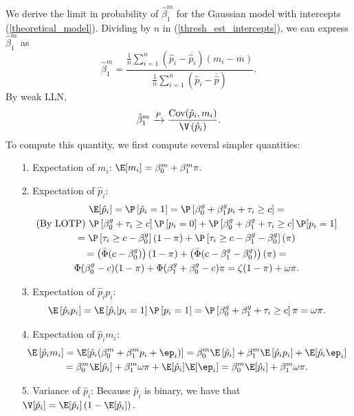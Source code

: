 \documentclass[12pt]{article}
\begin{document}
We derive the limit in probability of $\hat{\beta}^m_1$ for the Gaussian model with intercepts (\ref{theoretical_model}). Dividing by $n$ in (\ref{thresh_est_intercepts}), we can express $\hat{\beta}^m_1$ as
$$ \hat{\beta}^m_1 = \frac{ \frac{1}{n} \sum_{i=1}^n ( \hat{p}_i - \overline{\hat{p}_i})(m_i - \overline{m})}{ \frac{1}{n} \sum_{i=1}^n (\hat{p}_i - \overline{\hat{p}})}.$$ By weak LLN,
$$ \hat{\beta}^m_1 \xrightarrow{P} \frac{\textrm{Cov}(\hat{p}_i, m_i)}{\V\left(\hat{p}_i\right)}.$$ To compute this quantity, we first compute several simpler quantities:
\begin{itemize}
\item[1.] Expectation of $m_i$: $\E[m_i] = \beta^m_0 + \beta^m_1\pi.$
\item[2.] Expectation of $\hat{p}_i$: \begin{multline*}
\E[\hat{p}_i] = \P\left[\hat{p}_i = 1\right] = \P\left[\beta^g_0 + \beta^g_1 p_i + \tau_i \geq c \right] = \\ \textrm{(By LOTP) } \P\left[ \beta^g_0 + \tau_i \geq c \right]\P\left[p_i = 0\right] + \P\left[ \beta^g_0 + \beta^g_1 + \tau_i \geq c \right] \P[p_i = 1] \\ = \P\left[ \tau_i \geq c - \beta^g_0\right](1- \pi) + \P\left[ \tau_i \geq c - \beta^g_1 - \beta^g_0 \right](\pi) \\ =  \left(\bar{\Phi}(c - \beta^g_0) \right) (1 - \pi) + \left( \bar{\Phi}(c - \beta^g_1 - \beta^g_0) \right)(\pi) = \\  \Phi(\beta^g_0 - c) (1-\pi) + \Phi(\beta^g_1 + \beta^g_0 - c) \pi = \zeta(1-\pi) + \omega \pi.
\end{multline*}
\item[3.] Expectation of $\hat{p}_i p_i$: 
$$\E\left[ \hat{p}_i p_i \right] = \E\left[\hat{p}_i | p_i = 1 \right] \P\left[ p_i =1 \right] = \P\left[ \beta^g_0 + \beta^g_1 + \tau_i \geq c \right] \pi = \omega \pi.$$
\item[4.] Expectation of $\hat{p}_i m_i$:
\begin{multline*}
\E\left[\hat{p}_i m_i\right] = \E[\hat{p}_i (\beta^m_0 + \beta^m_1 p_i + \ep_i)] = \beta^m_0 \E\left[\hat{p}_i\right] + \beta^m_1 \E\left[\hat{p}_i p_i\right] + \E[\hat{p}_i \ep_i] \\ = \beta^m_0 \E[\hat{p}_i] + \beta^m_1 \omega \pi + \E[\hat{p}_i] \E[\ep_i] = \beta^m_0 \E[\hat{p}_i] + \beta^m_1 \omega \pi.
\end{multline*}
\item[5.] Variance of $\hat{p}_i$: Because $\hat{p}_i$ is binary, we have that $\V[\hat{p}_i] = \E[\hat{p}_i]\left(1 - \E[\hat{p}_i]\right) .$

\end{itemize}
\end{document}
